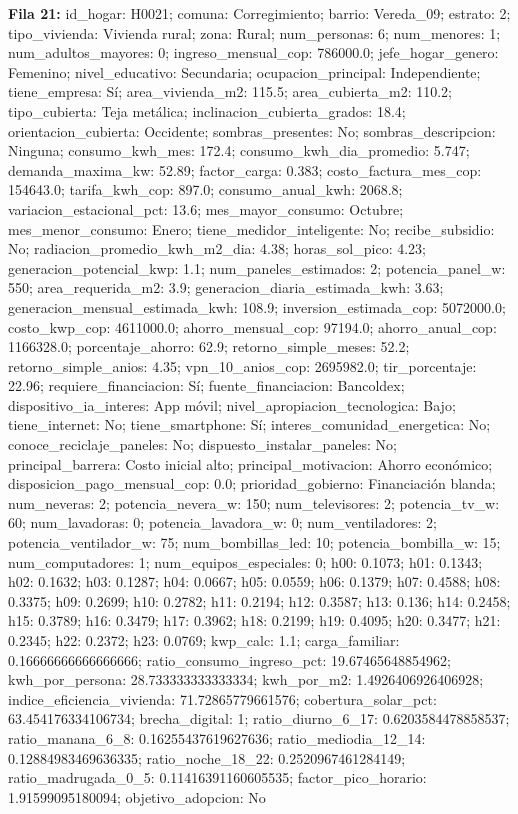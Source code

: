 {\footnotesize\textbf{Fila 21:} id\_hogar: H0021; comuna: Corregimiento; barrio: Vereda\_09; estrato: 2; tipo\_vivienda: Vivienda rural; zona: Rural; num\_personas: 6; num\_menores: 1; num\_adultos\_mayores: 0; ingreso\_mensual\_cop: 786000.0; jefe\_hogar\_genero: Femenino; nivel\_educativo: Secundaria; ocupacion\_principal: Independiente; tiene\_empresa: Sí; area\_vivienda\_m2: 115.5; area\_cubierta\_m2: 110.2; tipo\_cubierta: Teja metálica; inclinacion\_cubierta\_grados: 18.4; orientacion\_cubierta: Occidente; sombras\_presentes: No; sombras\_descripcion: Ninguna; consumo\_kwh\_mes: 172.4; consumo\_kwh\_dia\_promedio: 5.747; demanda\_maxima\_kw: 52.89; factor\_carga: 0.383; costo\_factura\_mes\_cop: 154643.0; tarifa\_kwh\_cop: 897.0; consumo\_anual\_kwh: 2068.8; variacion\_estacional\_pct: 13.6; mes\_mayor\_consumo: Octubre; mes\_menor\_consumo: Enero; tiene\_medidor\_inteligente: No; recibe\_subsidio: No; radiacion\_promedio\_kwh\_m2\_dia: 4.38; horas\_sol\_pico: 4.23; generacion\_potencial\_kwp: 1.1; num\_paneles\_estimados: 2; potencia\_panel\_w: 550; area\_requerida\_m2: 3.9; generacion\_diaria\_estimada\_kwh: 3.63; generacion\_mensual\_estimada\_kwh: 108.9; inversion\_estimada\_cop: 5072000.0; costo\_kwp\_cop: 4611000.0; ahorro\_mensual\_cop: 97194.0; ahorro\_anual\_cop: 1166328.0; porcentaje\_ahorro: 62.9; retorno\_simple\_meses: 52.2; retorno\_simple\_anios: 4.35; vpn\_10\_anios\_cop: 2695982.0; tir\_porcentaje: 22.96; requiere\_financiacion: Sí; fuente\_financiacion: Bancoldex; dispositivo\_ia\_interes: App móvil; nivel\_apropiacion\_tecnologica: Bajo; tiene\_internet: No; tiene\_smartphone: Sí; interes\_comunidad\_energetica: No; conoce\_reciclaje\_paneles: No; dispuesto\_instalar\_paneles: No; principal\_barrera: Costo inicial alto; principal\_motivacion: Ahorro económico; disposicion\_pago\_mensual\_cop: 0.0; prioridad\_gobierno: Financiación blanda; num\_neveras: 2; potencia\_nevera\_w: 150; num\_televisores: 2; potencia\_tv\_w: 60; num\_lavadoras: 0; potencia\_lavadora\_w: 0; num\_ventiladores: 2; potencia\_ventilador\_w: 75; num\_bombillas\_led: 10; potencia\_bombilla\_w: 15; num\_computadores: 1; num\_equipos\_especiales: 0; h00: 0.1073; h01: 0.1343; h02: 0.1632; h03: 0.1287; h04: 0.0667; h05: 0.0559; h06: 0.1379; h07: 0.4588; h08: 0.3375; h09: 0.2699; h10: 0.2782; h11: 0.2194; h12: 0.3587; h13: 0.136; h14: 0.2458; h15: 0.3789; h16: 0.3479; h17: 0.3962; h18: 0.2199; h19: 0.4095; h20: 0.3477; h21: 0.2345; h22: 0.2372; h23: 0.0769; kwp\_calc: 1.1; carga\_familiar: 0.16666666666666666; ratio\_consumo\_ingreso\_pct: 19.67465648854962; kwh\_por\_persona: 28.733333333333334; kwh\_por\_m2: 1.4926406926406928; indice\_eficiencia\_vivienda: 71.72865779661576; cobertura\_solar\_pct: 63.454176334106734; brecha\_digital: 1; ratio\_diurno\_6\_17: 0.6203584478858537; ratio\_manana\_6\_8: 0.16255437619627636; ratio\_mediodia\_12\_14: 0.12884983469636335; ratio\_noche\_18\_22: 0.2520967461284149; ratio\_madrugada\_0\_5: 0.11416391160605535; factor\_pico\_horario: 1.91599095180094; objetivo\_adopcion: No\par}
